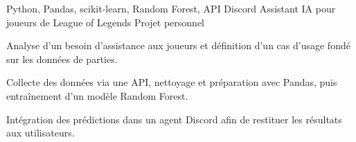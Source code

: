 
\begin{cventries}
  \cventry
    {Python, Pandas, scikit-learn, Random Forest, API Discord}
    {Assistant IA pour joueurs de League of Legends}
    {Projet personnel}
    {}
    {
      \begin{cvitems}
        \item {Analyse d’un besoin d’assistance aux joueurs et définition d’un cas d’usage fondé sur les données de parties.}
        \item {Collecte des données via une API, nettoyage et préparation avec Pandas, puis entraînement d’un modèle Random Forest.}
        \item {Intégration des prédictions dans un agent Discord afin de restituer les résultats aux utilisateurs.}
      \end{cvitems}
    }
\end{cventries}
